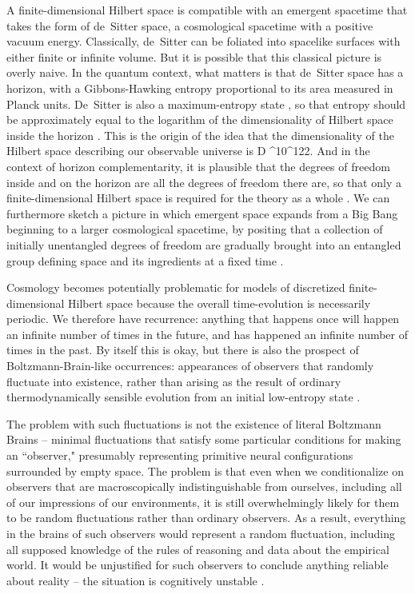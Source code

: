 \documentclass[aps,prd,nofootinbib,notitlepage,12pt]{revtex4-2}
\begin{document}
A finite-dimensional Hilbert space is compatible with an emergent spacetime that takes the form of de~Sitter space, a cosmological spacetime with a positive vacuum energy.
Classically, de~Sitter can be foliated into spacelike surfaces with either finite or infinite volume.
But it is possible that this classical picture is overly naive. 
In the quantum context, what matters is that de~Sitter space has a horizon, with a Gibbons-Hawking entropy proportional to its area measured in Planck units.
De~Sitter is also a maximum-entropy state \cite{Carroll:2017kjo}, so that entropy should be approximately equal to the logarithm of the dimensionality of Hilbert space inside the horizon \cite{Banks:2000fe}.
This is the origin of the idea that the dimensionality of the Hilbert space describing our observable universe is
\be
  D ^{10^{122}}.
\ee
And in the context of horizon complementarity, it is plausible that the degrees of freedom inside and on the horizon are all the degrees of freedom there are, so that only a finite-dimensional Hilbert space is required for the theory as a whole \cite{Nomura:2011dt,Bousso:2011up}.
We can furthermore sketch a picture in which emergent space expands from a Big Bang beginning to a larger cosmological spacetime, by positing that a collection of initially unentangled degrees of freedom are gradually brought into an entangled group defining space and its ingredients at a fixed time \cite{circuitcosmo}.

Cosmology becomes potentially problematic for models of discretized finite-dimensional Hilbert space because the overall time-evolution is necessarily periodic.
We therefore have recurrence: anything that happens once will happen an infinite number of times in the future, and has happened an infinite number of times in the past.
By itself this is okay, but there is also the prospect of Boltzmann-Brain-like occurrences: appearances of observers that randomly fluctuate into existence, rather than arising as the result of ordinary thermodynamically sensible evolution from an initial low-entropy state \cite{Dyson2002,Albrecht_2004,Carroll:2008yd}.

The problem with such fluctuations is not the existence of literal Boltzmann Brains -- minimal fluctuations that satisfy some particular conditions for making an ``observer," presumably representing primitive neural configurations surrounded by empty space.
The problem is that even when we conditionalize on observers that are macroscopically indistinguishable from ourselves, including all of our impressions of our environments, it is still overwhelmingly likely for them to be random fluctuations rather than ordinary observers.
As a result, everything in the brains of such observers would represent a random fluctuation, including all supposed knowledge of the rules of reasoning and data about the empirical world.
It would be unjustified for such observers to conclude anything reliable about reality -- the situation is cognitively unstable \cite{Carroll2017}.
\end{document}
